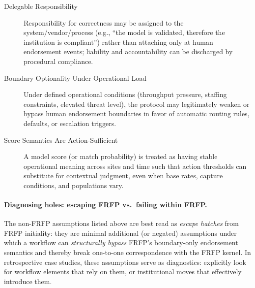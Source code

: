\begin{description}
\item[Delegable Responsibility]
Responsibility for correctness may be assigned to the system/vendor/process (e.g., ``the model is validated, therefore the institution is compliant'') rather than attaching only at human endorsement events; liability and accountability can be discharged by procedural compliance.

\item[Boundary Optionality Under Operational Load]
Under defined operational conditions (throughput pressure, staffing constraints, elevated threat level), the protocol may legitimately weaken or bypass human endorsement boundaries in favor of automatic routing rules, defaults, or escalation triggers.

\item[Score Semantics Are Action-Sufficient]
A model score (or match probability) is treated as having stable operational meaning across sites and time such that action thresholds can substitute for contextual judgment, even when base rates, capture conditions, and populations vary.

\end{description}

\paragraph{Diagnosing holes: escaping FRFP vs.\ failing within FRFP.}
The non-FRFP assumptions listed above are best read as \emph{escape hatches} from FRFP initiality: they are minimal additional (or negated) assumptions under which a workflow can \emph{structurally bypass} FRFP’s boundary-only endorsement semantics and thereby break one-to-one correspondence with the FRFP kernel. In retrospective case studies, these assumptions serve as diagnostics: explicitly look for workflow elements that rely on them, or institutional moves that effectively introduce them.

